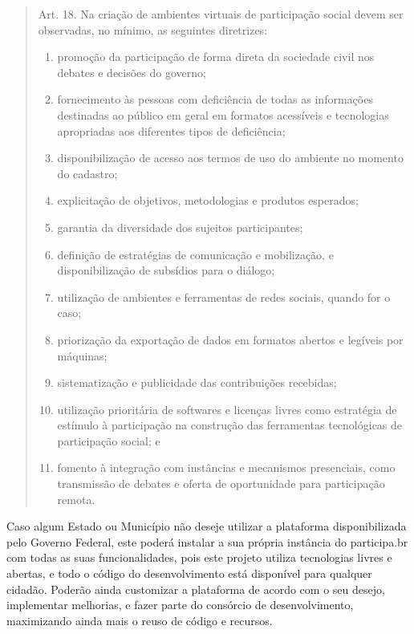 \documentclass{article}
\begin{document}
\begin{quote}
Art. 18.  Na criação de ambientes virtuais de participação social devem ser
observadas, no mínimo, as seguintes diretrizes:

\begin{enumerate}
  \item promoção da participação de forma direta da sociedade civil nos debates e decisões do governo;
  \item fornecimento às pessoas com deficiência de todas as informações destinadas ao público em geral em formatos acessíveis e tecnologias apropriadas aos diferentes tipos de deficiência;
  \item disponibilização de acesso aos termos de uso do ambiente no momento do cadastro;
  \item explicitação de objetivos, metodologias e produtos esperados;
  \item garantia da diversidade dos sujeitos participantes;
  \item definição de estratégias de comunicação e mobilização, e disponibilização de subsídios para o diálogo;
  \item utilização de ambientes e ferramentas de redes sociais, quando for o caso;
  \item priorização da exportação de dados em formatos abertos e legíveis por máquinas;
  \item sistematização e publicidade das contribuições recebidas;
  \item utilização prioritária de softwares e licenças livres como estratégia de estímulo à participação na construção das ferramentas tecnológicas de participação social; e
  \item fomento à integração com instâncias e mecanismos presenciais, como transmissão de debates e oferta de oportunidade para participação remota.
\end{enumerate}

\end{quote}


Caso algum Estado ou Município não deseje utilizar a plataforma disponibilizada
pelo Governo Federal, este poderá instalar a sua própria instância do
participa.br com todas as suas funcionalidades, pois este projeto utiliza
tecnologias livres e abertas, e todo o código do desenvolvimento está
disponível para qualquer cidadão. Poderão ainda customizar a plataforma de
acordo com o seu desejo, implementar melhorias, e fazer parte do consórcio de
desenvolvimento, maximizando ainda mais o reuso de código e recursos.
\end{document}
